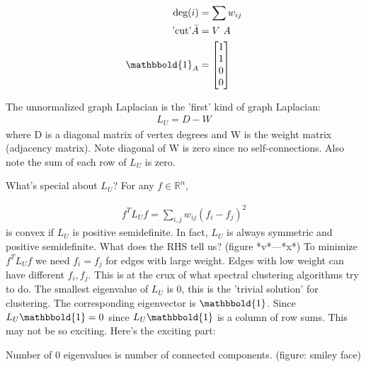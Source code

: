 \documentclass[11pt]{article}
\begin{document}
\begin{align*}
\text{deg}(i) &=\sum w_{ij} \\
\text{'cut'} \bar{A} &=V \ A \\
\mathbbold{1}_A &= \begin{bmatrix}
 1 \\
 1 \\
 0 \\
 0
\end{bmatrix}
\end{align*}

The unnormalized graph Laplacian is the 'first' kind of graph Laplacian:
\begin{align}
L_U = D - W
\end{align}
where D is a diagonal matrix of vertex degrees and W is the weight matrix (adjacency matrix).  Note diagonal of W is zero since no self-connections.  Also note the sum of each row of $L_U$ is zero.

What's special about $L_U$?
For any $f \in \mathbb{R}^n$, 

\begin{align}
f^TL_Uf=\sum_{i,j}w_{ij}(f_i-f_j)^2
\end{align}
is convex if $L_U$ is positive semidefinite.  In fact, $L_U$ is always symmetric and positive semidefinite.  What does the RHS tell us?  (figure *v*---*x*) To minimize $f^TL_Uf$ we need $f_i=f_j$ for edges with large weight.  Edges with low weight can have different $f_i,f_j$.  This is at the crux of what spectral clustering algorithms try to do.  The smallest eigenvalue of $L_U$ is 0, this is the 'trivial solution' for clustering.  The corresponding eigenvector is $\mathbbold{1}$.  Since $L_U\mathbbold{1}=0$ since $L_U\mathbbold{1}$ is a column of row sums.  This may not be so exciting.  Here's the exciting part:

Number of 0 eigenvalues is number of connected components.  (figure: smiley face)
%
%
\end{document}
